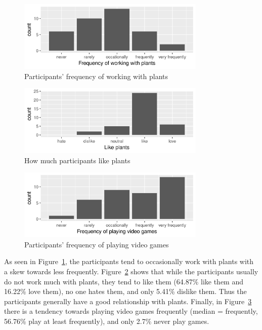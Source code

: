 \begin{figure}
    \centering
    \includegraphics[width=0.8\textwidth]{figures/user_plant_work}
    \caption{Participants' frequency of working with plants}
    \label{fig:plant_work}
\end{figure}

\begin{figure}
    \centering
    \includegraphics[width=0.8\textwidth]{figures/user_plant_like}
    \caption{How much participants like plants}
    \label{fig:plant_like}
\end{figure}

\begin{figure}
    \centering
    \includegraphics[width=0.8\textwidth]{figures/user_games}
    \caption{Participants' frequency of playing video games}
    \label{fig:games}
\end{figure}

As seen in Figure~\ref{fig:plant_work}, the participants tend to occasionally work with plants with a skew towards less frequently.
Figure~\ref{fig:plant_like} shows that while the participants usually do not work much with plants, they tend to like them (64.87\% like them and 16.22\% love them), no one hates them, and only 5.41\% dislike them.
Thus the participants generally have a good relationship with plants.
Finally, in Figure~\ref{fig:games} there is a tendency towards playing video games frequently (median = frequently, 56.76\% play at least frequently), and only 2.7\% never play games.

